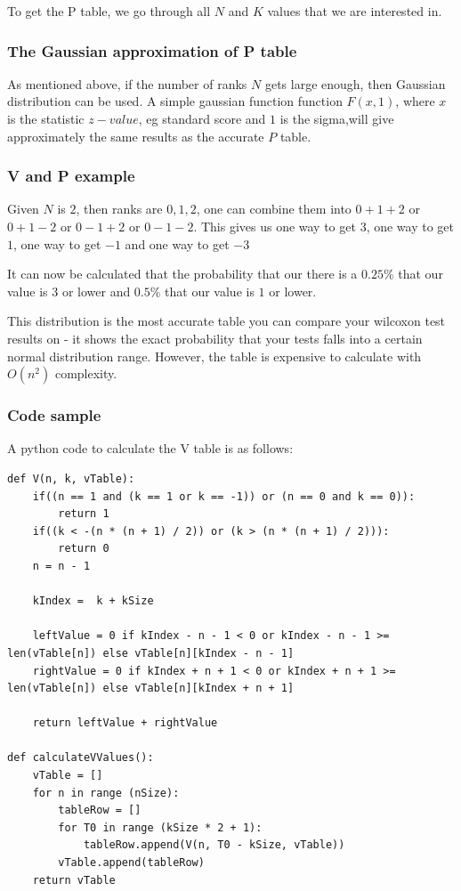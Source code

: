 \documentclass[12pt]{article}
\begin{document}
To get the P table, we go through all $N$ and $K$ values that we are interested in.

\subsubsection{The Gaussian approximation of P table}
As mentioned above, if the number of ranks $N$ gets large enough, then Gaussian distribution can be used. A simple gaussian function function $F(x, 1)$, where $x$ is the statistic $z-value$, eg standard score and $1$ is the sigma,will give approximately the same results as the accurate $P$ table.

\subsubsection{V and P example}

Given $N$ is $2$, then ranks are ${0, 1, 2}$, one can combine them into $0 + 1 + 2$ or $0 + 1 - 2$ or $0 - 1 + 2$ or $0 - 1 - 2$. This gives us one way to get $3$, one way to get $1$, one way to get $-1$ and one way to get $-3$

It can now be calculated that the probability that our there is a $0.25\%$ that our value is $3$ or lower and $0.5\%$ that our value is $1$ or lower.

This distribution is the most accurate table you can compare your wilcoxon test results on - it shows the exact probability that your tests falls into a certain normal distribution range. However, the table is expensive to calculate with $O(n^2)$ complexity.

\subsubsection{Code sample}
A python code to calculate the V table is as follows:
\begin{verbatim}
def V(n, k, vTable):
    if((n == 1 and (k == 1 or k == -1)) or (n == 0 and k == 0)):
        return 1
    if((k < -(n * (n + 1) / 2)) or (k > (n * (n + 1) / 2))):
        return 0
    n = n - 1

    kIndex =  k + kSize

    leftValue = 0 if kIndex - n - 1 < 0 or kIndex - n - 1 >= len(vTable[n]) else vTable[n][kIndex - n - 1]
    rightValue = 0 if kIndex + n + 1 < 0 or kIndex + n + 1 >= len(vTable[n]) else vTable[n][kIndex + n + 1]

    return leftValue + rightValue

def calculateVValues():
    vTable = []
    for n in range (nSize):
        tableRow = []
        for T0 in range (kSize * 2 + 1):
            tableRow.append(V(n, T0 - kSize, vTable))
        vTable.append(tableRow)
    return vTable

\end{verbatim}
\end{document}
